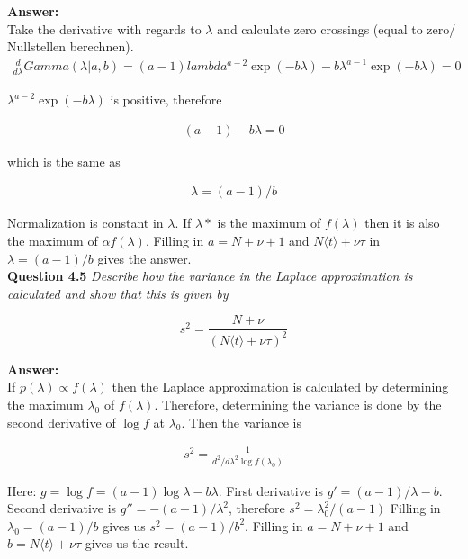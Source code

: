 \documentclass[a4paper]{article}
\begin{document}
\textbf{Answer:}\\

Take the derivative with regards to $\lambda$ and calculate  zero crossings (equal to zero/ Nullstellen berechnen).\\

\begin{align*}
\frac{d}{d \lambda} Gamma(\lambda | a, b) = (a - 1) lambda^{a - 2} \exp(-b \lambda) - b \lambda^{a-1} \exp(-b \lambda) = 0
\end{align*}

$\lambda^{a-2} \exp(-b \lambda)$ is positive, therefore

\begin{align*}
	(a - 1) - b \lambda = 0
\end{align*}

which is the same as

\begin{align*}
\lambda = (a-1)/b
\end{align*}

Normalization is constant in $\lambda$. If $\lambda*$ is the maximum of $f(\lambda)$ then it is also the maximum of $\alpha f(\lambda)$. Filling in $a = N + \nu + 1$ and $N \langle t \rangle + \nu \tau$ in $\lambda = (a - 1)/b$ gives the answer.\\

\textbf{Question 4.5}  \textit{Describe how the variance in the Laplace approximation is calculated and show that this is given by}

\begin{equation}
	s^2 = \frac{N + \nu}{(N \langle t \rangle + \nu \tau)^2}
\end{equation}

\textbf{Answer:}\\

If $p(\lambda) \propto f(\lambda)$ then the Laplace approximation is calculated by determining the maximum $\lambda_0$ of $f(\lambda)$. Therefore, determining the variance is done by the second derivative of $\log f$ at $\lambda_0$. Then the variance is

\begin{align*}
s^2 = \frac{1}{d^2/d \lambda^2 \log f(\lambda_0)	}
\end{align*}

Here: $g = \log f = (a - 1) \log \lambda - b \lambda$. First derivative is $g' = (a-1)/\lambda - b$. Second derivative is $g'' = - (a - 1)/\lambda^2$, therefore $s^2 = \lambda_0^2/(a-1)$ Filling in $\lambda_0 = (a - 1)/b$ gives us $s^2 = (a-1)/b^2$. Filling in $a = N + \nu + 1$ and $b = N \langle t \rangle + \nu \tau$ gives us the result.\\
\end{document}
